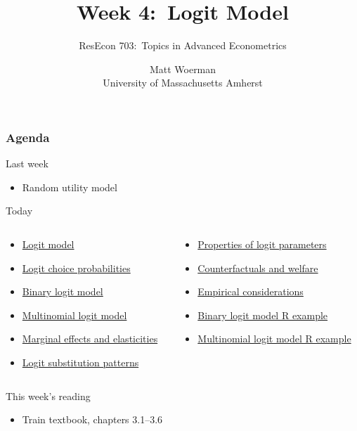 \documentclass{beamer}\usepackage[]{graphicx}\usepackage[]{color}
\title[Week 4:\ Logit Model]{Week 4:\ Logit Model}
\author[ResEcon 703:\ Advanced Econometrics]{ResEcon 703:\ Topics in Advanced Econometrics}
\date{Matt Woerman\\University of Massachusetts Amherst}
\begin{document}
{ 
\begin{frame}[noframenumbering]
    \titlepage
\end{frame}
}

\begin{frame}\frametitle{Agenda}
    Last week
    \begin{itemize}
        \item Random utility model
    \end{itemize}
    \vspace{2ex}
    Today
    \begin{columns}
        \begin{column}{0.5\textwidth}
            \begin{itemize}
                \item \hyperlink{page.\getpagerefnumber{logit}}{Logit model}
                \item \hyperlink{page.\getpagerefnumber{probs}}{Logit choice probabilities}
                \item \hyperlink{page.\getpagerefnumber{binary}}{Binary logit model}
                \item \hyperlink{page.\getpagerefnumber{multi}}{Multinomial logit model}
                \item \hyperlink{page.\getpagerefnumber{marginal}}{Marginal effects and elasticities}
                \item \hyperlink{page.\getpagerefnumber{subs}}{Logit substitution patterns}
            \end{itemize}
        \end{column}
        \begin{column}{0.5\textwidth}
            \begin{itemize}
                \item \hyperlink{page.\getpagerefnumber{params}}{Properties of logit parameters}
                \item \hyperlink{page.\getpagerefnumber{counter}}{Counterfactuals and welfare}
                \item \hyperlink{page.\getpagerefnumber{empirical}}{Empirical considerations}
                \item \hyperlink{page.\getpagerefnumber{binary_r}}{Binary logit model R example}
                \item \hyperlink{page.\getpagerefnumber{multi_r}}{Multinomial logit model R example}
            \end{itemize}
            \vspace{\fill}
        \end{column}
    \end{columns}
    \vspace{3ex}
    This week's reading
    \begin{itemize}
        \item Train textbook, chapters 3.1--3.6
    \end{itemize}
\end{frame}
\end{document}
